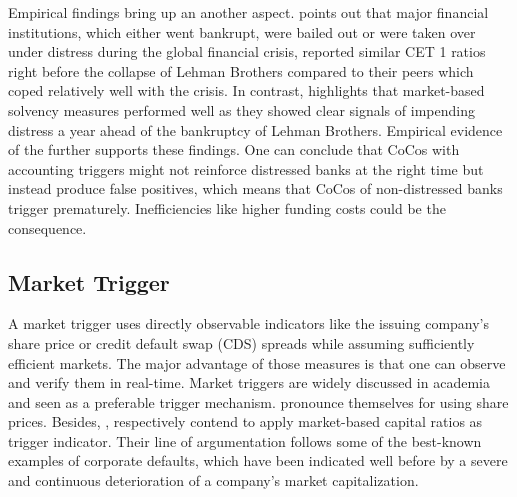 Empirical findings bring up an another aspect. \citet{haldane2011capital} points out that major financial institutions, which either went bankrupt, were bailed out or were taken over under distress during the global financial crisis, reported similar CET 1 ratios right before the collapse of Lehman Brothers compared to their peers which coped relatively well with the crisis. In contrast, \citet{haldane2011capital} highlights that market-based solvency measures performed well as they showed clear signals of impending distress a year ahead of the bankruptcy of Lehman Brothers. Empirical evidence of the  further supports these findings. One can conclude that CoCos with accounting triggers might not reinforce distressed banks at the right time but instead produce false positives, which means that CoCos of non-distressed banks trigger prematurely. Inefficiencies like higher funding costs could be the consequence. \citep{pazarbasioglu2011contingent}

\subsection{Market Trigger} \label{markettrigger}

A market trigger uses directly observable indicators like the issuing company's share price or credit default swap (CDS) spreads while assuming sufficiently efficient markets. The major advantage of those measures is that one can observe and verify them in real-time. \citep{haldane2011capital} Market triggers are widely discussed in academia and seen as a preferable trigger mechanism. \citet{calomiris2013design} pronounce themselves for using share prices. Besides, \citet{haldane2011capital}, \citet{pazarbasioglu2011contingent} respectively \citet{calomiris2013design} contend to apply market-based capital ratios as trigger indicator. Their line of argumentation follows some of the best-known examples of corporate defaults, which have been indicated well before by a severe and continuous deterioration of a company's market capitalization.\\ 

